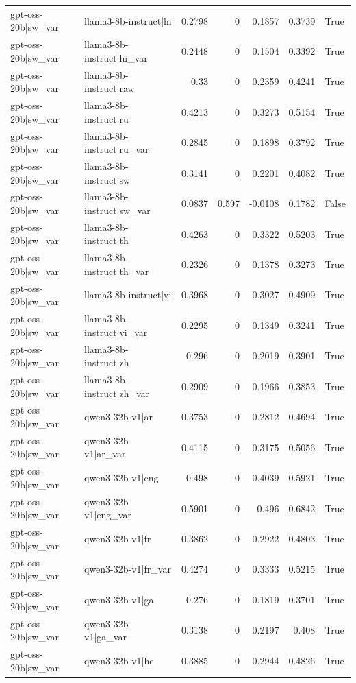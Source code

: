 \begin{table}
\begin{tabular}{l l r r r r l}
gpt-oss-20b|sw_var & llama3-8b-instruct|hi & 0.2798 & 0 & 0.1857 & 0.3739 & True \\
gpt-oss-20b|sw_var & llama3-8b-instruct|hi_var & 0.2448 & 0 & 0.1504 & 0.3392 & True \\
gpt-oss-20b|sw_var & llama3-8b-instruct|raw & 0.33 & 0 & 0.2359 & 0.4241 & True \\
gpt-oss-20b|sw_var & llama3-8b-instruct|ru & 0.4213 & 0 & 0.3273 & 0.5154 & True \\
gpt-oss-20b|sw_var & llama3-8b-instruct|ru_var & 0.2845 & 0 & 0.1898 & 0.3792 & True \\
gpt-oss-20b|sw_var & llama3-8b-instruct|sw & 0.3141 & 0 & 0.2201 & 0.4082 & True \\
gpt-oss-20b|sw_var & llama3-8b-instruct|sw_var & 0.0837 & 0.597 & -0.0108 & 0.1782 & False \\
gpt-oss-20b|sw_var & llama3-8b-instruct|th & 0.4263 & 0 & 0.3322 & 0.5203 & True \\
gpt-oss-20b|sw_var & llama3-8b-instruct|th_var & 0.2326 & 0 & 0.1378 & 0.3273 & True \\
gpt-oss-20b|sw_var & llama3-8b-instruct|vi & 0.3968 & 0 & 0.3027 & 0.4909 & True \\
gpt-oss-20b|sw_var & llama3-8b-instruct|vi_var & 0.2295 & 0 & 0.1349 & 0.3241 & True \\
gpt-oss-20b|sw_var & llama3-8b-instruct|zh & 0.296 & 0 & 0.2019 & 0.3901 & True \\
gpt-oss-20b|sw_var & llama3-8b-instruct|zh_var & 0.2909 & 0 & 0.1966 & 0.3853 & True \\
gpt-oss-20b|sw_var & qwen3-32b-v1|ar & 0.3753 & 0 & 0.2812 & 0.4694 & True \\
gpt-oss-20b|sw_var & qwen3-32b-v1|ar_var & 0.4115 & 0 & 0.3175 & 0.5056 & True \\
gpt-oss-20b|sw_var & qwen3-32b-v1|eng & 0.498 & 0 & 0.4039 & 0.5921 & True \\
gpt-oss-20b|sw_var & qwen3-32b-v1|eng_var & 0.5901 & 0 & 0.496 & 0.6842 & True \\
gpt-oss-20b|sw_var & qwen3-32b-v1|fr & 0.3862 & 0 & 0.2922 & 0.4803 & True \\
gpt-oss-20b|sw_var & qwen3-32b-v1|fr_var & 0.4274 & 0 & 0.3333 & 0.5215 & True \\
gpt-oss-20b|sw_var & qwen3-32b-v1|ga & 0.276 & 0 & 0.1819 & 0.3701 & True \\
gpt-oss-20b|sw_var & qwen3-32b-v1|ga_var & 0.3138 & 0 & 0.2197 & 0.408 & True \\
gpt-oss-20b|sw_var & qwen3-32b-v1|he & 0.3885 & 0 & 0.2944 & 0.4826 & True \\

\end{tabular}
\end{table}
